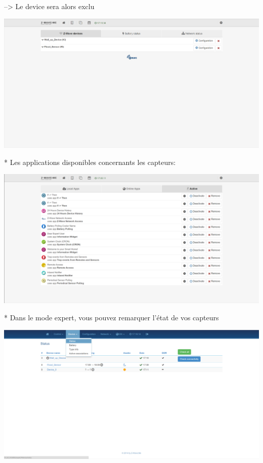 --> Le device sera alors exclu


\includegraphics[scale=0.5]{./latex/Images/png/devices_exclu_zwaveme.png}\newline


* Les applications disponibles concernants les capteurs:

\includegraphics[scale=0.5]{./latex/Images/png/app_zwaveme.png}\newline 

* Dans le mode expert, vous pouvez remarquer l'état de vos capteurs

\includegraphics[scale=0.5]{./latex/Images/png/device_Status.png}\newline


